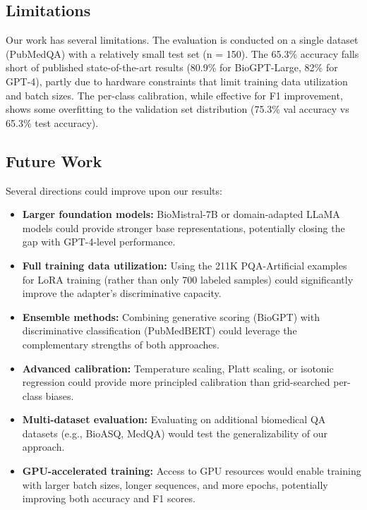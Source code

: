 \documentclass[conference]{IEEEtran}
\begin{document}
\subsection{Limitations}

Our work has several limitations. The evaluation is conducted on a single dataset (PubMedQA) with a relatively small test set (n = 150). The 65.3\% accuracy falls short of published state-of-the-art results (80.9\% for BioGPT-Large, 82\% for GPT-4), partly due to hardware constraints that limit training data utilization and batch sizes. The per-class calibration, while effective for F1 improvement, shows some overfitting to the validation set distribution (75.3\% val accuracy vs 65.3\% test accuracy).

\subsection{Future Work}

Several directions could improve upon our results:

\begin{itemize}[leftmargin=*]
    \item \textbf{Larger foundation models:} BioMistral-7B or domain-adapted LLaMA models could provide stronger base representations, potentially closing the gap with GPT-4-level performance.
    \item \textbf{Full training data utilization:} Using the 211K PQA-Artificial examples for LoRA training (rather than only 700 labeled samples) could significantly improve the adapter's discriminative capacity.
    \item \textbf{Ensemble methods:} Combining generative scoring (BioGPT) with discriminative classification (PubMedBERT) could leverage the complementary strengths of both approaches.
    \item \textbf{Advanced calibration:} Temperature scaling, Platt scaling, or isotonic regression could provide more principled calibration than grid-searched per-class biases.
    \item \textbf{Multi-dataset evaluation:} Evaluating on additional biomedical QA datasets (e.g., BioASQ, MedQA) would test the generalizability of our approach.
    \item \textbf{GPU-accelerated training:} Access to GPU resources would enable training with larger batch sizes, longer sequences, and more epochs, potentially improving both accuracy and F1 scores.
\end{itemize}
\end{document}

